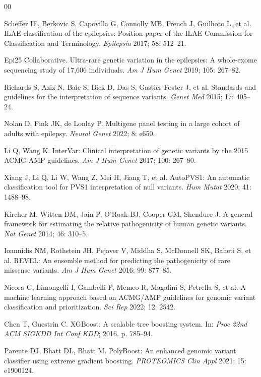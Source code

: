 \documentclass[12pt,a4paper]{article}
\begin{document}
\begin{thebibliography}{00}

Scheffer IE, Berkovic S, Capovilla G, Connolly MB, French J, Guilhoto L,
et al. ILAE classification of the epilepsies: Position paper of the ILAE
Commission for Classification and Terminology.
\textit{Epilepsia} 2017; 58: 512--21.

Epi25 Collaborative. Ultra-rare genetic variation in the epilepsies:
A whole-exome sequencing study of 17,606 individuals.
\textit{Am J Hum Genet} 2019; 105: 267--82.

Richards S, Aziz N, Bale S, Bick D, Das S, Gastier-Foster J, et al.
Standards and guidelines for the interpretation of sequence variants.
\textit{Genet Med} 2015; 17: 405--24.

Nolan D, Fink JK, de Lonlay P. Multigene panel testing in a large cohort
of adults with epilepsy.
\textit{Neurol Genet} 2022; 8: e650.

Li Q, Wang K. InterVar: Clinical interpretation of genetic variants by
the 2015 ACMG-AMP guidelines.
\textit{Am J Hum Genet} 2017; 100: 267--80.

Xiang J, Li Q, Li W, Wang Z, Mei H, Jiang T, et al.
AutoPVS1: An automatic classification tool for PVS1 interpretation of
null variants.
\textit{Hum Mutat} 2020; 41: 1488--98.

Kircher M, Witten DM, Jain P, O'Roak BJ, Cooper GM, Shendure J.
A general framework for estimating the relative pathogenicity of human
genetic variants.
\textit{Nat Genet} 2014; 46: 310--5.

Ioannidis NM, Rothstein JH, Pejaver V, Middha S, McDonnell SK,
Baheti S, et al. REVEL: An ensemble method for predicting the
pathogenicity of rare missense variants.
\textit{Am J Hum Genet} 2016; 99: 877--85.

Nicora G, Limongelli I, Gambelli P, Memeo R, Magalini S, Petrella S,
et al. A machine learning approach based on ACMG/AMP guidelines for
genomic variant classification and prioritization.
\textit{Sci Rep} 2022; 12: 2542.

Chen T, Guestrin C. XGBoost: A scalable tree boosting system. In:
\textit{Proc 22nd ACM SIGKDD Int Conf KDD}; 2016. p. 785--94.

Parente DJ, Bhatt DL, Bhatt M. PolyBoost: An enhanced genomic variant
classifier using extreme gradient boosting.
\textit{PROTEOMICS Clin Appl} 2021; 15: e1900124.


\end{thebibliography}
\end{document}
